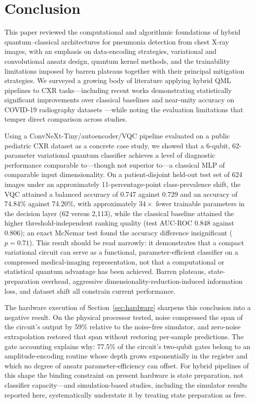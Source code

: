 \documentclass[11pt,a4paper]{article}
\begin{document}
\section{Conclusion}
\label{sec:conclusion}

This paper reviewed the computational and algorithmic foundations of hybrid
quantum--classical architectures for pneumonia detection from chest X-ray
images, with an emphasis on data-encoding strategies, variational and
convolutional ansatz design, quantum kernel methods, and the trainability
limitations imposed by barren plateaus together with their principal
mitigation strategies.  We surveyed a growing body of literature applying
hybrid QML pipelines to CXR tasks---including recent works demonstrating
statistically significant improvements over classical baselines
\cite{kulkarni2023} and near-unity accuracy on COVID-19 radiography datasets
\cite{rao2024}---while noting the evaluation limitations that temper direct
comparison across studies.

Using a ConvNeXt-Tiny/autoencoder/VQC pipeline evaluated on a public pediatric
CXR dataset as a concrete case study, we showed that a 6-qubit, 62-parameter
variational quantum classifier achieves a level of diagnostic performance
comparable to---though not superior to---a classical MLP of comparable input
dimensionality.  On a patient-disjoint held-out test set of 624 images under
an approximately 11-percentage-point class-prevalence shift, the VQC attained a
balanced accuracy of 0.747 against 0.729 and an accuracy of 74.84\% against
74.20\%, with approximately $34\times$ fewer trainable parameters in the
decision layer (62 versus 2{,}113), while the classical baseline attained the
higher threshold-independent ranking quality (test AUC-ROC 0.848 against
0.806); an exact McNemar test found the accuracy difference insignificant
($p = 0.71$).  This result should be read narrowly: it demonstrates that a
compact variational circuit can serve as a functional, parameter-efficient
classifier on a compressed medical-imaging representation, not that a
computational or statistical quantum advantage has been achieved.  Barren
plateaus, state-preparation overhead, aggressive
dimensionality-reduction-induced information loss, and dataset shift all
constrain current performance.

The hardware execution of Section~\ref{sec:hardware} sharpens this conclusion
into a negative result.  On the physical processor tested, noise compressed
the span of the circuit's output by 59\% relative to the noise-free simulator,
and zero-noise extrapolation restored that span without restoring per-sample
predictions.  The gate accounting explains why: 77.5\% of the circuit's
two-qubit gates belong to an amplitude-encoding routine whose depth grows
exponentially in the register and which no degree of ansatz
parameter-efficiency can offset.  For hybrid pipelines of this shape the
binding constraint on present hardware is state preparation, not classifier
capacity---and simulation-based studies, including the simulator results
reported here, systematically understate it by treating state preparation as
free.
\end{document}
